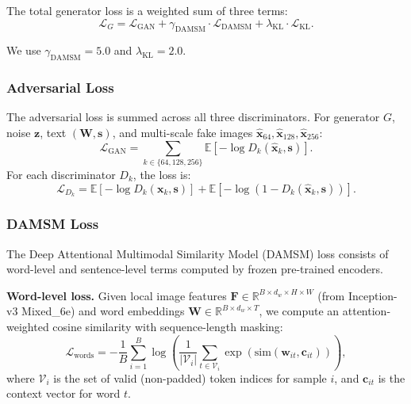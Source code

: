 \documentclass[conference]{IEEEtran}
\begin{document}
The total generator loss is a weighted sum of three terms:
\begin{equation}
    \mathcal{L}_G = \mathcal{L}_{\text{GAN}} + \gamma_{\text{DAMSM}} \cdot \mathcal{L}_{\text{DAMSM}} + \lambda_{\text{KL}} \cdot \mathcal{L}_{\text{KL}}.
\end{equation}

We use $\gamma_{\text{DAMSM}} = 5.0$ and $\lambda_{\text{KL}} = 2.0$.

\subsubsection{Adversarial Loss}
The adversarial loss is summed across all three discriminators. For generator $G$, noise $\mathbf{z}$, text $(\mathbf{W}, \mathbf{s})$, and multi-scale fake images $\hat{\mathbf{x}}_{64}, \hat{\mathbf{x}}_{128}, \hat{\mathbf{x}}_{256}$:
\begin{equation}
    \mathcal{L}_{\text{GAN}} = \sum_{k \in \{64,128,256\}} \mathbb{E}\left[ -\log D_k(\hat{\mathbf{x}}_k, \mathbf{s}) \right].
\end{equation}
For each discriminator $D_k$, the loss is:
\begin{equation}
    \mathcal{L}_{D_k} = \mathbb{E}\left[ -\log D_k(\mathbf{x}_k, \mathbf{s}) \right] + \mathbb{E}\left[ -\log(1 - D_k(\hat{\mathbf{x}}_k, \mathbf{s})) \right].
\end{equation}

\subsubsection{DAMSM Loss}
The Deep Attentional Multimodal Similarity Model (DAMSM) loss consists of word-level and sentence-level terms computed by frozen pre-trained encoders.

\textbf{Word-level loss.} Given local image features $\mathbf{F} \in \mathbb{R}^{B \times d_w \times H \times W}$ (from Inception-v3 Mixed\_6e) and word embeddings $\mathbf{W} \in \mathbb{R}^{B \times d_w \times T}$, we compute an attention-weighted cosine similarity with sequence-length masking:
\begin{equation}
    \mathcal{L}_{\text{words}} = -\frac{1}{B} \sum_{i=1}^{B} \log \left( \frac{1}{|\mathcal{V}_i|} \sum_{t \in \mathcal{V}_i} \exp(\text{sim}(\mathbf{w}_{it}, \mathbf{c}_{it})) \right),
\end{equation}
where $\mathcal{V}_i$ is the set of valid (non-padded) token indices for sample $i$, and $\mathbf{c}_{it}$ is the context vector for word $t$.
\end{document}
